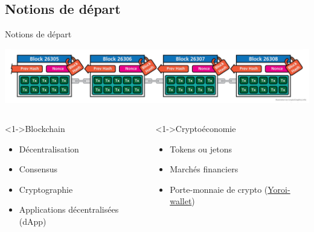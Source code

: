 \documentclass[presentation]{beamer}
\begin{document}
\subsection{Notions de départ}
\label{sec:orge15284c}
\begin{frame}[label={sec:org0e122a6}]{Notions de départ}
\begin{center}
\includegraphics[width=\textwidth]{Pictures/cryptographics/anatomy-of-a-chain-1.png}
\end{center}

\begin{columns}
\begin{column}{0.54\columnwidth}
\begin{block}<1->{Blockchain}
\begin{itemize}
\item <2> Décentralisation
\item <2> Consensus
\item <2> Cryptographie
\item <2> Applications décentralisées (dApp)
\end{itemize}
\end{block}
\end{column}
\begin{column}{0.46\columnwidth}
\begin{block}<1->{Cryptoéconomie}
\begin{itemize}
\item <0>Tokens ou jetons
\item <0>Marchés financiers
\item <0>Porte-monnaie de crypto (\href{https://yoroi-wallet.com}{Yoroi-wallet})
\end{itemize}
\end{block}
\end{column}
\end{columns}
\end{frame}
\end{document}
